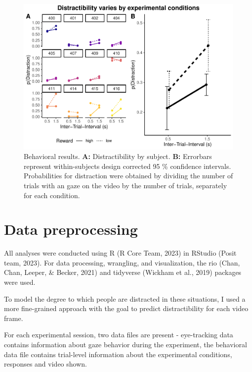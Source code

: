 \documentclass[
  man,floatsintext]{apa6}
\begin{document}
\begin{figure}
\centering
\includegraphics{FinalReport_files/figure-latex/behavioral-1.pdf}
\caption{\label{fig:behavioral}Behavioral results. \textbf{A:} Distractibility by subject. \textbf{B:} Errorbars represent within-subjects design corrected 95 \% confidence intervals. Probabilities for distraction were obtained by dividing the number of trials with an gaze on the video by the number of trials, separately for each condition.}
\end{figure}

\hypertarget{data-preprocessing}{%
\section{Data preprocessing}\label{data-preprocessing}}

All analyses were conducted using R (R Core Team, 2023) in RStudio (Posit team, 2023). For data processing, wrangling, and visualization, the rio (Chan, Chan, Leeper, \& Becker, 2021) and tidyverse (Wickham et al., 2019) packages were used.

To model the degree to which people are distracted in these situations, I used a more fine-grained approach with the goal to predict distractibility for each video frame.

For each experimental session, two data files are present - eye-tracking data contains information about gaze behavior during the experiment, the behavioral data file contains trial-level information about the experimental conditions, responses and video shown.
\end{document}
